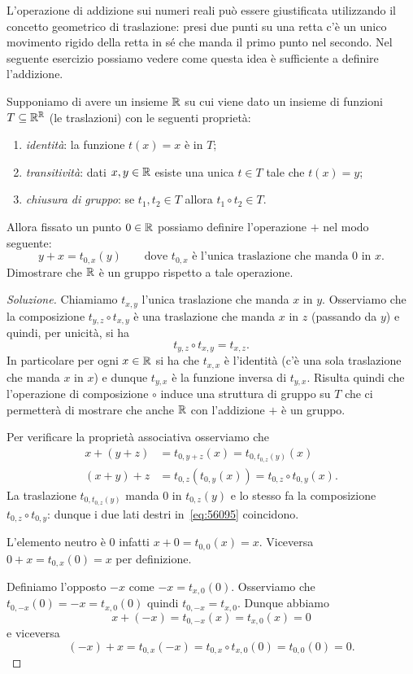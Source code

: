 L'operazione di addizione sui numeri reali può essere giustificata 
utilizzando il concetto geometrico di traslazione:
presi due punti su una retta c'è un unico movimento 
rigido della retta in sé che manda il primo punto nel secondo.
Nel seguente esercizio possiamo vedere come questa 
idea è sufficiente a definire l'addizione.
%
\begin{exercise}[traslazioni su $\RR$]
Supponiamo di avere un insieme $\RR$ su cui viene dato un insieme 
di funzioni $T\subseteq {\mathbb R}^{\mathbb R}$ (le traslazioni) con le seguenti 
proprietà:
\begin{enumerate}
  \item \emph{identità}: la funzione $t(x)=x$ è in $T$;
  \item \emph{transitività}: dati $x,y\in {\mathbb R}$ esiste una unica $t\in T$ tale che $t(x)=y$;
  \item \emph{chiusura di gruppo}: se $t_1,t_2\in T$ allora $t_1\circ t_2 \in T$.
\end{enumerate}
Allora fissato un punto $0\in {\mathbb R}$ possiamo definire l'operazione $+$ 
nel modo seguente:
\[
    y + x = t_{0,x}(y) \qquad\text{dove $t_{0,x}$ è l'unica traslazione 
    che manda $0$ in $x$}.
\]  
Dimostrare che $\RR$ è un gruppo rispetto a tale operazione.
\end{exercise}
%
\begin{proof}[Soluzione]
Chiamiamo $t_{x,y}$ l'unica traslazione che manda $x$ in $y$.
Osserviamo che la composizione $t_{y,z}\circ t_{x,y}$ è una traslazione 
che manda $x$ in $z$ (passando da $y$) e quindi, per unicità, si ha 
\[
  t_{y,z}\circ t_{x,y} = t_{x,z}.
\]
In particolare per ogni $x\in {\mathbb R}$ si ha che $t_{x,x}$ è l'identità
(c'è una sola traslazione che manda $x$ in $x$) e dunque $t_{y,x}$ 
è la funzione inversa di $t_{y,x}$. Risulta quindi che 
l'operazione di composizione $\circ$ induce una struttura di gruppo 
su $T$ che ci permetterà di mostrare che anche $\RR$ con l'addizione
$+$ è un gruppo.

Per verificare la proprietà associativa 
osserviamo che
\begin{equation}\label{eq:56095}
  \begin{aligned}
x + (y + z) &= t_{0,y+z}(x)=t_{0,t_{0,z}(y)}(x)  \\
(x + y) + z &= t_{0,z}(t_{0,y}(x)) = t_{0,z}\circ t_{0,y}(x).
  \end{aligned}
\end{equation}
La traslazione $t_{0,t_{0,z}(y)}$ manda $0$ in $t_{0,z}(y)$
e lo stesso fa la composizione $t_{0,z}\circ t_{0,y}$:
dunque i due lati destri in~\eqref{eq:56095} coincidono.

L'elemento neutro è $0$ infatti $x + 0 = t_{0,0}(x) = x$.
Viceversa $0 + x = t_{0,x}(0) = x$ per definizione.

Definiamo l'opposto $-x$ come $-x=t_{x,0}(0)$.
Osserviamo che $t_{0,-x}(0) = -x = t_{x,0}(0)$ quindi 
$t_{0,-x} = t_{x,0}$. Dunque abbiamo 
\[
 x + (-x) = t_{0,-x}(x) = t_{x,0}(x) = 0  
\]
e viceversa 
\[
  (-x) + x = t_{0,x}(-x) = t_{0,x}\circ t_{x,0}(0) 
   = t_{0,0}(0) = 0.  
\]
\end{proof}

